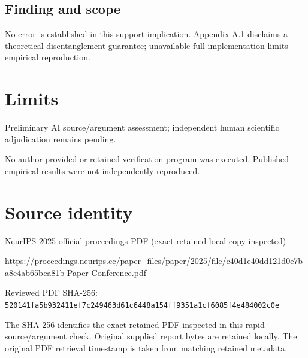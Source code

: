\documentclass[11pt]{article}
\begin{document}
\subsection*{Finding and scope}

No error is established in this support implication. Appendix A.1 disclaims a theoretical disentanglement guarantee; unavailable full implementation limits empirical reproduction.

\section*{Limits}

Preliminary AI source/argument assessment; independent human scientific adjudication remains pending.\par

No author-provided or retained verification program was executed. Published empirical results were not independently reproduced.\par

\section*{Source identity}

NeurIPS 2025 official proceedings PDF (exact retained local copy inspected)

\url{https://proceedings.neurips.cc/paper_files/paper/2025/file/c40d1e40dd121d0e7ba8e4ab65bca81b-Paper-Conference.pdf}

Reviewed PDF SHA-256: \nolinkurl{520141fa5b932411ef7c249463d61c6448a154ff9351a1cf6085f4e484002c0e}

The SHA-256 identifies the exact retained PDF inspected in this rapid source/argument check. Original supplied report bytes are retained locally. The original PDF retrieval timestamp is taken from matching retained metadata.
\end{document}
